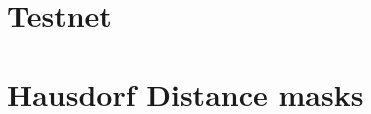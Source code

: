 % 

% 
% 
% 
% 
% 
% 
% 

% 
% 
% 
% 
% 
% 

% 
% 
% 
% 
% 
% 
% 
% 
% 

\chapter{Testnet}


\chapter{Hausdorf Distance masks}






%
%




% 

